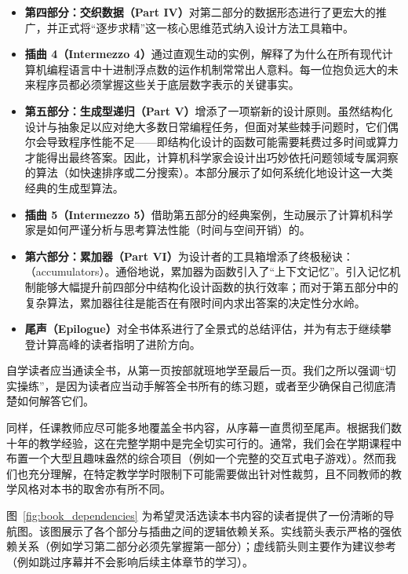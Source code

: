 \begin{itemize}
  \item \textbf{第四部分：交织数据（Part IV）}对第二部分的数据形态进行了更宏大的推广，并正式将“逐步求精”这一核心思维范式纳入设计方法工具箱中。
  
  \item \textbf{插曲 4（Intermezzo 4）}通过直观生动的实例，解释了为什么在所有现代计算机编程语言中十进制浮点数的运作机制常常出人意料。每一位抱负远大的未来程序员都必须掌握这些关于底层数字表示的关键事实。
  
  \item \textbf{第五部分：生成型递归（Part V）}增添了一项崭新的设计原则。虽然结构化设计与抽象足以应对绝大多数日常编程任务，但面对某些棘手问题时，它们偶尔会导致程序性能不足——即结构化设计的函数可能需要耗费过多时间或算力才能得出最终答案。因此，计算机科学家会设计出巧妙依托问题领域专属洞察的算法（如快速排序或二分搜索）。本部分展示了如何系统化地设计这一大类经典的生成型算法。
  
  \item \textbf{插曲 5（Intermezzo 5）}借助第五部分的经典案例，生动展示了计算机科学家是如何严谨分析与思考算法性能（时间与空间开销）的。
  
  \item \textbf{第六部分：累加器（Part VI）}为设计者的工具箱增添了终极秘诀：（accumulators）。通俗地说，累加器为函数引入了“上下文记忆”。引入记忆机制能够大幅提升前四部分中结构化设计函数的执行效率；而对于第五部分中的复杂算法，累加器往往是能否在有限时间内求出答案的决定性分水岭。
  
  \item \textbf{尾声（Epilogue）}对全书体系进行了全景式的总结评估，并为有志于继续攀登计算高峰的读者指明了进阶方向。
\end{itemize}

自学读者应当通读全书，从第一页按部就班地学至最后一页。我们之所以强调“切实操练”，是因为读者应当动手解答全书所有的练习题，或者至少确保自己彻底清楚如何解答它们。

同样，任课教师应尽可能多地覆盖全书内容，从序幕一直贯彻至尾声。根据我们数十年的教学经验，这在完整学期中是完全切实可行的。通常，我们会在学期课程中布置一个大型且趣味盎然的综合项目（例如一个完整的交互式电子游戏）。然而我们也充分理解，在特定教学学时限制下可能需要做出针对性裁剪，且不同教师的教学风格对本书的取舍亦有所不同。

图~\ref{fig:book_dependencies} 为希望灵活选读本书内容的读者提供了一份清晰的导航图。该图展示了各个部分与插曲之间的逻辑依赖关系。实线箭头表示严格的强依赖关系（例如学习第二部分必须先掌握第一部分）；虚线箭头则主要作为建议参考（例如跳过序幕并不会影响后续主体章节的学习）。

